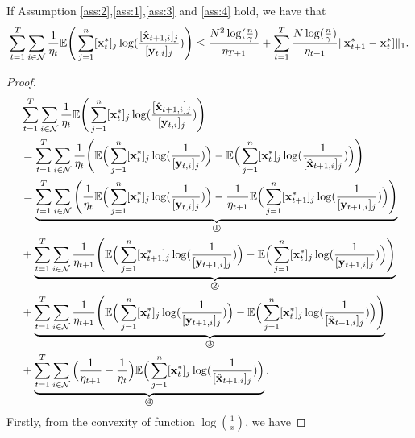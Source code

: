 	\begin{lemma}\label{lemma::11} If Assumption \ref{ass:2},\ref{ass:1},\ref{ass:3} and \ref{ass:4} hold, we have that
	\begin{equation*}
		\begin{aligned}
		\sum_{t=1}^{T}\sum_{i\in\mathcal{N}}\frac{1}{\eta_{t}}\mathbb{E}\Bigg(\sum_{j=1}^{n}[\mathbf{x}_{t}^{*}]_{j}\log(\frac{[\hat{\mathbf{x}}_{t+1,i}]_{j}}{[\mathbf{y}_{t,i}]_{j}})\Bigg)\le\frac{N^{2}\log(\frac{n}{\gamma})}{\eta_{T+1}}+\sum_{t=1}^{T}\frac{N\log(\frac{n}{\gamma})}{\eta_{t+1}}\|\mathbf{x}_{t+1}^{*}-\mathbf{x}_{t}^{*}]\|_{1}.
		\end{aligned}
	\end{equation*}
\end{lemma}
\begin{proof}
	\begin{equation*}
		\begin{aligned}
			&\sum_{t=1}^{T}\sum_{i\in\mathcal{N}}\frac{1}{\eta_{t}}\mathbb{E}\Bigg(\sum_{j=1}^{n}[\mathbf{x}_{t}^{*}]_{j}\log(\frac{[\hat{\mathbf{x}}_{t+1,i}]_{j}}{[\mathbf{y}_{t,i}]_{j}})\Bigg)\\&=\sum_{t=1}^{T}\sum_{i\in\mathcal{N}}\frac{1}{\eta_{t}}\Bigg(\mathbb{E}\Big(\sum_{j=1}^{n}[\mathbf{x}_{t}^{*}]_{j}\log(\frac{1}{[\mathbf{y}_{t,i}]_{j}})\Big)-\mathbb{E}\Big(\sum_{j=1}^{n}[\mathbf{x}_{t}^{*}]_{j}\log(\frac{1}{[\hat{\mathbf{x}}_{t+1,i}]_{j}})\Big)\Bigg)\\
			&=\underbrace{\sum_{t=1}^{T}\sum_{i\in\mathcal{N}}\Bigg(\frac{1}{\eta_{t}}\mathbb{E}\Big(\sum_{j=1}^{n}[\mathbf{x}_{t}^{*}]_{j}\log(\frac{1}{[\mathbf{y}_{t,i}]_{j}})\Big)-\frac{1}{\eta_{t+1}}\mathbb{E}\Big(\sum_{j=1}^{n}[\mathbf{x}_{t+1}^{*}]_{j}\log(\frac{1}{[\mathbf{y}_{t+1,i}]_{j}})\Big)\Bigg)}_{\text{\textcircled{1}}}\\
			&+\underbrace{\sum_{t=1}^{T}\sum_{i\in\mathcal{N}}\frac{1}{\eta_{t+1}}\Bigg(\mathbb{E}\Big(\sum_{j=1}^{n}[\mathbf{x}_{t+1}^{*}]_{j}\log(\frac{1}{[\mathbf{y}_{t+1,i}]_{j}})\Big)-\mathbb{E}\Big(\sum_{j=1}^{n}[\mathbf{x}_{t}^{*}]_{j}\log(\frac{1}{[\mathbf{y}_{t+1,i}]_{j}})\Big)\Bigg)}_{\text{\textcircled{2}}}\\
			&+\underbrace{\sum_{t=1}^{T}\sum_{i\in\mathcal{N}}\frac{1}{\eta_{t+1}}\Bigg(\mathbb{E}\Big(\sum_{j=1}^{n}[\mathbf{x}_{t}^{*}]_{j}\log(\frac{1}{[\mathbf{y}_{t+1,i}]_{j}})\Big)-\mathbb{E}\Big(\sum_{j=1}^{n}[\mathbf{x}_{t}^{*}]_{j}\log(\frac{1}{[\hat{\mathbf{x}}_{t+1,i}]_{j}})\Big)\Bigg)}_{\text{\textcircled{3}}}\\
			&+\underbrace{\sum_{t=1}^{T}\sum_{i\in\mathcal{N}}\Big(\frac{1}{\eta_{t+1}}-\frac{1}{\eta_{t}}\Big)\mathbb{E}\Big(\sum_{j=1}^{n}[\mathbf{x}_{t}^{*}]_{j}\log(\frac{1}{[\hat{\mathbf{x}}_{t+1,i}]_{j}})\Big)}_{\text{\textcircled{4}}}.
		\end{aligned}
	\end{equation*}
	Firstly, from the  convexity of function $\log(\frac{1}{x})$, we have 

\end{proof}
